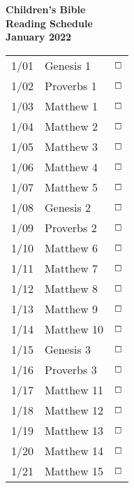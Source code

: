 \documentclass[10pt,landscape,letterpaper]{article}
\begin{document}

\begin{multicols}{5}
\begin{center}
\textbf{Children's Bible\\
Reading Schedule\\January 2022}
\end{center}

\begin{tabular}{p{0.3in}p{0.75in}p{0.4in}}
1/01 & \textcolor[rgb]{0.98,0.00,0.00}{Genesis 1} & \textcolor[rgb]{0.98,0.00,0.00}{$\boxempty$} \\
1/02 & \textcolor[rgb]{0.98,0.00,0.00}{Proverbs 1} & \textcolor[rgb]{0.98,0.00,0.00}{$\boxempty$} \\
1/03 & Matthew 1 & $\boxempty$ \\
1/04 & Matthew 2 & $\boxempty$ \\
1/05 & Matthew 3 & $\boxempty$ \\
1/06 & Matthew 4 & $\boxempty$ \\
1/07 & Matthew 5 & $\boxempty$ \\

1/08 & \textcolor[rgb]{0.98,0.00,0.00}{Genesis 2} & \textcolor[rgb]{0.98,0.00,0.00}{$\boxempty$} \\
1/09 & \textcolor[rgb]{0.98,0.00,0.00}{Proverbs 2} & \textcolor[rgb]{0.98,0.00,0.00}{$\boxempty$} \\
1/10 & Matthew 6 & $\boxempty$ \\
1/11 & Matthew 7 & $\boxempty$ \\
1/12 & Matthew 8 & $\boxempty$ \\
1/13 & Matthew 9 & $\boxempty$ \\
1/14 & Matthew 10 & $\boxempty$ \\

1/15 & \textcolor[rgb]{0.98,0.00,0.00}{Genesis 3} & \textcolor[rgb]{0.98,0.00,0.00}{$\boxempty$} \\
1/16 & \textcolor[rgb]{0.98,0.00,0.00}{Proverbs 3} & \textcolor[rgb]{0.98,0.00,0.00}{$\boxempty$} \\
1/17 & Matthew 11 & $\boxempty$ \\
1/18 & Matthew 12 & $\boxempty$ \\
1/19 & Matthew 13 & $\boxempty$ \\
1/20 & Matthew 14 & $\boxempty$ \\
1/21 & Matthew 15 & $\boxempty$ \\


\end{tabular}
\end{multicols}
\end{document}
